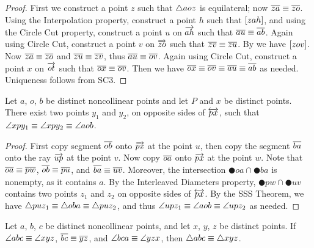 \begin{proof}
First we construct a point \(z\) such that \(\bigtriangleup{aoz}\) is equilateral; now \(\overline{za} \equiv \overline{zo}\).
Using the Interpolation property, construct a point \(h\) such that \([ z a h ]\), and using the Circle Cut property, construct a point \(u\) on \(\overrightarrow{ah}\) such that \(\overline{au} \equiv \overline{ab}\).
Again using Circle Cut, construct a point \(v\) on \(\overrightarrow{zo}\) such that \(\overline{zv} \equiv \overline{zu}\).
By  we have \([ z o v ]\).
Now \(\overline{za} \equiv \overline{zo}\) and \(\overline{zu} \equiv \overline{zv}\), thus \(\overline{au} \equiv \overline{ov}\).
Again using Circle Cut, construct a point \(x\) on \(\overrightarrow{ot}\) such that \(\overline{ox} \equiv \overline{ov}\).
Then we have \(\overline{ox} \equiv \overline{ov} \equiv \overline{au} \equiv \overline{ab}\) as needed.
Uniqueness follows from SC3.
\end{proof}

\begin{construct}
Let \(a\), \(o\), \(b\) be distinct noncollinear points and let \(P\) and \(x\) be distinct points.
There exist two points \(y_1\) and \(y_2\), on opposite sides of \(\overleftrightarrow{px}\), such that \(\angle{xpy_1} \equiv \angle{xpy_2} \equiv \angle{aob}\). 
\end{construct}

\begin{proof}
First copy segment \(\overline{ob}\) onto \(\overrightarrow{px}\) at the point \(u\), then copy the segment \(\overline{ba}\) onto the ray \(\overrightarrow{up}\) at the point \(v\).
Now copy \(\overline{oa}\) onto \(\overrightarrow{px}\) at the point \(w\).
Note that \(\overline{oa} \equiv \overline{pw}\), \(\overline{ob} \equiv \overline{pu}\), and \(\overline{ba} \equiv \overline{uv}\).
Moreover, the intersection \(\CIRCLE{o}{a} \cap \CIRCLE{b}{a}\) is nonempty, as it contains \(a\).
By the Interleaved Diameters property, \(\CIRCLE{p}{w} \cap \CIRCLE{u}{v}\) contains two points \(z_1\) and \(z_2\) on opposite sides of \(\overleftrightarrow{px}\).
By the SSS Theorem, we have \(\bigtriangleup{puz_1} \equiv \bigtriangleup{oba} \equiv \bigtriangleup{puz_2}\), and thus \(\angle{upz_1} \equiv \angle{aob} \equiv \angle{upz_2}\) as needed.
\end{proof}

\begin{prop}
Let \(a\), \(b\), \(c\) be distinct noncollinear points, and let \(x\), \(y\), \(z\) be distinct points.
If \(\angle{abc} \equiv \angle{xyz}\), \(\overline{bc} \equiv \overline{yz}\), and \(\angle{bca} \equiv \angle{yzx}\), then \(\bigtriangleup{abc} \equiv \bigtriangleup{xyz}\).
\end{prop}


